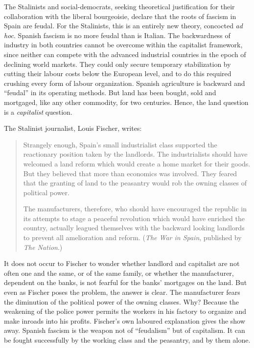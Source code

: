 The Stalinists and social-democrats, seeking theoretical justification for their collaboration with the liberal bourgeoisie, declare that the roots of fascism in Spain are feudal. For the Stalinists, this is an entirely new theory, concocted \emph{ad hoc}. Spanish fascism is no more feudal than is Italian. The backwardness of industry in both countries cannot be overcome within the capitalist framework, since neither can compete with the advanced industrial countries in the epoch of declining world markets. They could only secure temporary stabilization by cutting their labour costs below the European level, and to do this required crushing every form of labour organization. Spanish agriculture is backward and ``feudal'' in its operating methods. But land has been bought, sold and mortgaged, like any other commodity, for two centuries. Hence, the land question is a \emph{capitalist} question.
\noclub

The Stalinist journalist, Louis Fischer,{\indexLFischer} writes:

\begin{quotation}
  \sloppy
  
  Strangely enough, Spain’s small industrialist class supported the reactionary position taken by the landlords. The industrialists should have welcomed a land reform which would create a home market for their goods. But they believed that more than economics was involved. They feared that the granting of land to the peasantry would rob the owning classes of political power.
  
  The manufacturers, therefore, who should have encouraged the republic in its attempts to stage a peaceful revolution which would have enriched the country, actually leagued themselves with the backward looking landlords to prevent all amelioration and reform. (\emph{The War in Spain}, published by \emph{The Nation}.)
\end{quotation}

It does not occur to Fischer to wonder whether landlord and capitalist are not often one and the same, or of the same family, or whether the manufacturer, dependent on the banks, is not fearful for the banks’ mortgages on the land. But even as Fischer poses the problem, the answer is clear. The manufacturer fears the diminution of the political power of the owning classes. Why? Because the weakening of the police power permits the workers in his factory to organize and make inroads into his profits. Fischer’s own laboured explanation gives the show away. Spanish fascism is the weapon not of ``feudalism'' but of capitalism. It can be fought successfully by the working class and the peasantry, and by them alone.
